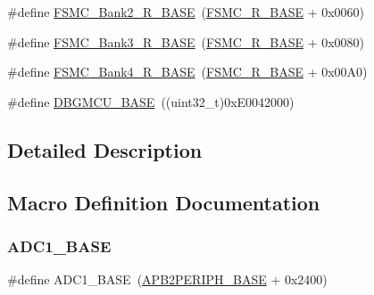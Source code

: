 \begin{DoxyCompactItemize}
\item 
\#define \hyperlink{group___peripheral__memory__map_ga3cb46d62f4f6458e186a5a4c753e4918}{F\+S\+M\+C\+\_\+\+Bank2\+\_\+\+R\+\_\+\+B\+A\+SE}~(\hyperlink{group___peripheral__memory__map_gaddf0e199dccba83272b20c9fb4d3aaed}{F\+S\+M\+C\+\_\+\+R\+\_\+\+B\+A\+SE} + 0x0060)
\item 
\#define \hyperlink{group___peripheral__memory__map_gacf056152c9e5aefcc67db78d1302c0d7}{F\+S\+M\+C\+\_\+\+Bank3\+\_\+\+R\+\_\+\+B\+A\+SE}~(\hyperlink{group___peripheral__memory__map_gaddf0e199dccba83272b20c9fb4d3aaed}{F\+S\+M\+C\+\_\+\+R\+\_\+\+B\+A\+SE} + 0x0080)
\item 
\#define \hyperlink{group___peripheral__memory__map_gaf9e5417133160b0bdd0498d982acec19}{F\+S\+M\+C\+\_\+\+Bank4\+\_\+\+R\+\_\+\+B\+A\+SE}~(\hyperlink{group___peripheral__memory__map_gaddf0e199dccba83272b20c9fb4d3aaed}{F\+S\+M\+C\+\_\+\+R\+\_\+\+B\+A\+SE} + 0x00\+A0)
\item 
\#define \hyperlink{group___peripheral__memory__map_ga4adaf4fd82ccc3a538f1f27a70cdbbef}{D\+B\+G\+M\+C\+U\+\_\+\+B\+A\+SE}~((uint32\+\_\+t)0x\+E0042000)
\end{DoxyCompactItemize}


\subsection{Detailed Description}


\subsection{Macro Definition Documentation}
\mbox{\label{group___peripheral__memory__map_ga695c9a2f892363a1c942405c8d351b91}} 
\subsubsection{\texorpdfstring{A\+D\+C1\+\_\+\+B\+A\+SE}{ADC1\_BASE}}
{\footnotesize\ttfamily \#define A\+D\+C1\+\_\+\+B\+A\+SE~(\hyperlink{group___peripheral__memory__map_ga25b99d6065f1c8f751e78f43ade652cb}{A\+P\+B2\+P\+E\+R\+I\+P\+H\+\_\+\+B\+A\+SE} + 0x2400)}



